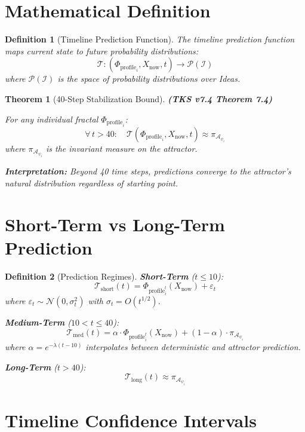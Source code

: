 \documentclass[11pt,twoside]{book}
\newcommand{\Ideas}{\mathcal{I}}
\newcommand{\PsychAttractor}{\mathcal{A}_\psi}
\newcommand{\ProfileFrac}{\Phi_{\mathrm{profile}}}
\newcommand{\Timeline}{\mathcal{T}}
\newtheorem{definition}{Definition}[chapter]
\newtheorem{theorem}{Theorem}[chapter]
\begin{document}
\section{Mathematical Definition}

\begin{definition}[Timeline Prediction Function]
\label{def:timeline-pred}
The \emph{timeline prediction function} maps current state to future probability distributions:
\[
    \Timeline : \left(\ProfileFrac_i, X_{\text{now}}, t\right) \longrightarrow \mathcal{P}(\Ideas)
\]
where $\mathcal{P}(\Ideas)$ is the space of probability distributions over Ideas.
\end{definition}

\begin{theorem}[40-Step Stabilization Bound]
\label{thm:40-step}
\textbf{(TKS v7.4 Theorem 7.4)}

For any individual fractal $\ProfileFrac_i$:
\[
    \forall\, t > 40: \quad \Timeline(\ProfileFrac_i, X_{\text{now}}, t) \approx \pi_{\PsychAttractor_i}
\]
where $\pi_{\PsychAttractor_i}$ is the invariant measure on the attractor.

\textbf{Interpretation:} Beyond 40 time steps, predictions converge to the attractor's natural distribution regardless of starting point.
\end{theorem}

\section{Short-Term vs Long-Term Prediction}

\begin{definition}[Prediction Regimes]
\label{def:pred-regimes}
\textbf{Short-Term} ($t \leq 10$):
\[
    \Timeline_{\text{short}}(t) = \ProfileFrac_i^t(X_{\text{now}}) + \varepsilon_t
\]
where $\varepsilon_t \sim \mathcal{N}(0, \sigma_t^2)$ with $\sigma_t = O(t^{1/2})$.

\textbf{Medium-Term} ($10 < t \leq 40$):
\[
    \Timeline_{\text{med}}(t) = \alpha \cdot \ProfileFrac_i^t(X_{\text{now}}) + (1-\alpha) \cdot \pi_{\PsychAttractor_i}
\]
where $\alpha = e^{-\lambda(t-10)}$ interpolates between deterministic and attractor prediction.

\textbf{Long-Term} ($t > 40$):
\[
    \Timeline_{\text{long}}(t) \approx \pi_{\PsychAttractor_i}
\]
\end{definition}

\section{Timeline Confidence Intervals}
\end{document}
